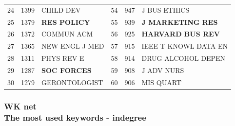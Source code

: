 \documentclass[hyperref={pdfstartview={FitBH -32768},
                         pdfpagemode=FullScreen,
                         plainpages=false,
                         colorlinks=true}
              ]{beamer}
\begin{document}
\begin{frame}[fragile]
\begin{tabular}{r|r|l||r|r|l}
24&	1399&	CHILD DEV&	54&	947&	J BUS ETHICS\\
25&	1379&	\textbf{RES POLICY}&	55&	939&	\textbf{J MARKETING RES}\\
26&	1372&	COMMUN ACM&	56&	925&	\textbf{HARVARD BUS REV}\\
27&	1365&	NEW ENGL J MED&	57&	915&	IEEE T KNOWL DATA EN\\
28&	1311&	PHYS REV E&	58&	914&	DRUG ALCOHOL DEPEN\\
29&	1287&	\textbf{SOC FORCES}&	59&	908&	J ADV NURS\\
30&	1279&	GERONTOLOGIST&	60&	906&	MIS QUART\\ \hline
\end{tabular}
\end{frame}

\begin{frame}[fragile]
\frametitle{WK net \\ \normalsize The most used keywords - indegree}


\end{frame}
\end{document}
